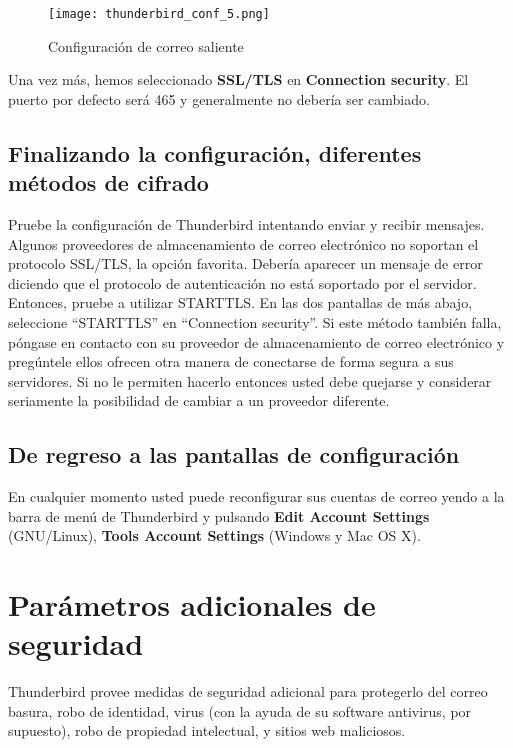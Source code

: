 \documentclass[10pt,a5paper,twoside,,]{book}
\begin{document}
\begin{figure}[htbp]
\centering
\texttt{[image: thunderbird\_conf\_5.png]}
\caption{Configuración de correo saliente}
\end{figure}

Una vez más, hemos seleccionado \textbf{SSL/TLS} en \textbf{Connection
security}. El puerto por defecto será 465 y generalmente no debería ser
cambiado.

\section{Finalizando la configuración, diferentes métodos de
cifrado}\label{finalizando-la-configuraciuxf3n-diferentes-muxe9todos-de-cifrado}

Pruebe la configuración de Thunderbird intentando enviar y recibir
mensajes. Algunos proveedores de almacenamiento de correo electrónico no
soportan el protocolo SSL/TLS, la opción favorita. Debería aparecer un
mensaje de error diciendo que el protocolo de autenticación no está
soportado por el servidor. Entonces, pruebe a utilizar STARTTLS. En las
dos pantallas de más abajo, seleccione ``STARTTLS'' en ``Connection
security''. Si este método también falla, póngase en contacto con su
proveedor de almacenamiento de correo electrónico y pregúntele ellos
ofrecen otra manera de conectarse de forma segura a sus servidores. Si
no le permiten hacerlo entonces usted debe quejarse y considerar
seriamente la posibilidad de cambiar a un proveedor diferente.

\section{De regreso a las pantallas de
configuración}\label{de-regreso-a-las-pantallas-de-configuraciuxf3n}

En cualquier momento usted puede reconfigurar sus cuentas de correo
yendo a la barra de menú de Thunderbird y pulsando \textbf{Edit
\textbar{} Account Settings} (GNU/Linux), \textbf{Tools \textbar{}
Account Settings} (Windows y Mac OS X).

\chapter{Parámetros adicionales de
seguridad}\label{paruxe1metros-adicionales-de-seguridad}

Thunderbird provee medidas de seguridad adicional para protegerlo del
correo basura, robo de identidad, virus (con la ayuda de su software
antivirus, por supuesto), robo de propiedad intelectual, y sitios web
maliciosos.
\end{document}
